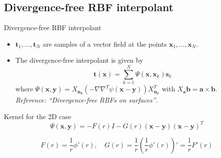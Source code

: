 \documentclass{beamer}
\begin{document}
\subsection{Divergence-free RBF interpolant}
\begin{frame}{Divergence-free RBF interpolant}
  \begin{itemize}
    \item $\mathbf{t}_1,\ldots,\mathbf{t}_N$ are samples of a vector field at
      the points $\mathbf{x}_1,\ldots,\mathbf{x}_N$.
      
    \item The divergence-free interpolant is given by
      \begin{equation*}
	\mathbf{t}(\mathbf{x}) = \sum_{k = 1}^{N}
	{\Psi(\mathbf{x},\mathbf{x}_k)\mathbf{s}_k}
      \end{equation*}
      where $\Psi(\mathbf{x},\mathbf{y}) = X_\mathbf{n_x}
      (-\nabla\nabla^T\psi(\mathbf{x} - \mathbf{y}))X_{\mathbf{n_y}}^T$ with
      $X_\mathbf{a}\mathbf{b} = \mathbf{a}\times\mathbf{b}$. \emph{Reference:
	``Divergence-free RBFs on surfaces''}.
  \end{itemize}
\end{frame}

\begin{frame}{Kernel for the 2D case}
  \begin{equation*}
    \Psi(\mathbf{x},\mathbf{y}) = -F(r)I - G(r)(\mathbf{x} - 
    \mathbf{y})(\mathbf{x} - \mathbf{y})^T
  \end{equation*}

  \begin{equation*}
    F(r) = \frac{1}{r}\phi'(r), \quad G(r) = 
    \frac{1}{r}\left(\frac{1}{r}\phi'(r)\right)' = \frac{1}{r}F'(r)
  \end{equation*}
\end{frame}
\end{document}
